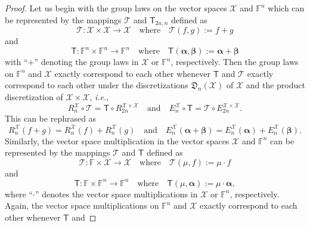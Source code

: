 \documentclass[a4paper]{paper}
\newcommand{\Discr}{\mathfrak{D}}
\newcommand{\VecSpace}[1]{\mathscr{#1}}
\newcommand{\Field}{\mathbb{F}}
\newcommand{\Op}[1]{\mathcal{#1}}
\newcommand{\DiscOp}[1]{\mathsf{#1}}
\newcommand*{\EXT}[2]{\ensuremath{E_{#1}^{#2}}}
\newcommand*{\REST}[2]{\ensuremath{R_{#1}^{#2}}}
\newcommand*{\RnX}{\ensuremath{\REST{n}{\VecSpace{X}}}}
\newcommand*{\EnX}{\ensuremath{\EXT{n}{\VecSpace{X}}}}
\newcommand{\ie}{\textsl{i.e.}\xspace}
\newcommand{\valpha}{\boldsymbol{\alpha}}
\newcommand{\vbeta}{\boldsymbol{\beta}}
\begin{document}
\begin{proof}
 Let us begin with the  group laws on the vector spaces $\VecSpace{X}$ and $\Field^{n}$ which can be 
 represented by the mappings $\Op{T}$ and $\DiscOp{T}_{2n,n}$ defined as
 \begin{equation*}
  \Op{T} \colon \VecSpace{X} \times \VecSpace{X} \to \VecSpace{X} 
  \quad\text{where}\quad
  \Op{T}(f, g) := f + g
 \end{equation*}
 and
 \begin{equation*}
  \DiscOp{T} \colon \Field^{n} \times \Field^{n} \to \Field^{n} 
  \quad\text{where}\quad 
  \DiscOp{T}(\valpha, \vbeta) := \valpha + \vbeta
 \end{equation*}
 with ``$+$'' denoting the group laws in $\VecSpace{X}$ or $\Field^{n}$, respectively. Then the group laws on $\Field^{n}$ and 
 $\VecSpace{X}$ exactly correspond to each other whenever $\DiscOp{T}$ and $\Op{T}$ exactly correspond to each other under the 
 discretizations $\Discr_{n}(\VecSpace{X})$ of $\VecSpace{X}$ and the product discretization of $\VecSpace{X}\times \VecSpace{X}$, 
 \ie,
 \begin{equation*}
  \RnX \circ \Op{T} =  \DiscOp{T} \circ \REST{2n}{\VecSpace{X}\times \VecSpace{X}} 
  \quad\text{and}\quad 
  \EnX \circ \DiscOp{T} = \Op{T} \circ \EXT{2n}{\VecSpace{X}\times \VecSpace{X}}.
 \end{equation*}
 This can be rephrased as
 \begin{equation*}
  \RnX(f + g) = \RnX(f) + \RnX(g) 
  \quad\text{and}\quad 
  \EnX(\valpha + \vbeta) = \EnX(\valpha) + \EnX(\vbeta).
 \end{equation*}
 Similarly, the vector space multiplication in the vector spaces $\VecSpace{X}$ and $\Field^{n}$ can be represented by the mappings 
 $\Op{T}$ and $\DiscOp{T}$ defined as 
 \begin{equation*}
  \Op{T} \colon \Field \times \VecSpace{X} \to \VecSpace{X} 
  \quad\text{where}\quad
  \Op{T}(\mu, f):=\mu \cdot f
 \end{equation*}
 and
 \begin{equation*}
  \DiscOp{T} \colon  \Field \times \Field^{n} \to \Field^{n} 
  \quad\text{where}\quad
  \DiscOp{T}(\mu, \valpha):=\mu \cdot \valpha,
 \end{equation*}
 where ``$\cdot$'' denotes the vector space multiplications in $\VecSpace{X}$ or $\Field^{n}$, respectively. Again, 
 the vector space multiplications on $\Field^{n}$ and $\VecSpace{X}$ exactly correspond to each other whenever $\DiscOp{T}$ and 

\end{proof}
\end{document}
